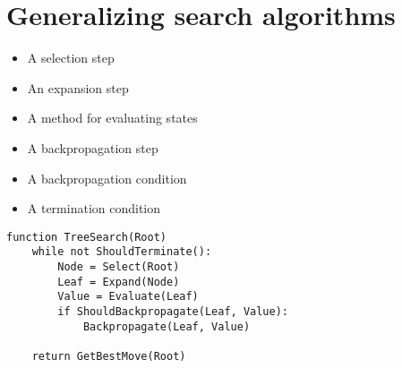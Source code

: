 \section{Generalizing search algorithms}



\begin{itemize}
    \item A selection step
    \item An expansion step
    \item A method for evaluating states
    \item A backpropagation step
    \item A backpropagation condition
    \item A termination condition
\end{itemize}

\begin{lstlisting}
function TreeSearch(Root)
    while not ShouldTerminate():
        Node = Select(Root)
        Leaf = Expand(Node)
        Value = Evaluate(Leaf)
        if ShouldBackpropagate(Leaf, Value):
            Backpropagate(Leaf, Value)

    return GetBestMove(Root)
\end{lstlisting}

